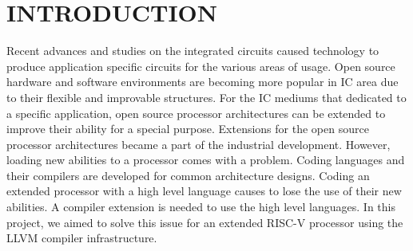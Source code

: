 \chapter{INTRODUCTION}\label{Ch1}
\justifying


Recent advances and studies on the integrated circuits caused technology to produce application specific circuits for the various areas of usage. Open source hardware and software environments are becoming more popular in IC area due to their flexible and improvable structures. For the IC mediums that dedicated to a specific application, open source processor architectures can be extended to improve their ability for a special purpose. Extensions for the open source processor architectures became a part of the industrial development. However, loading new abilities to a processor comes with a problem. Coding languages and their compilers are developed for common architecture designs. Coding an extended processor with a high level language causes to lose the use of their new abilities. A compiler extension is needed to use the high level languages. In this project, we aimed to solve this issue for an extended RISC-V processor using the LLVM compiler infrastructure. 
